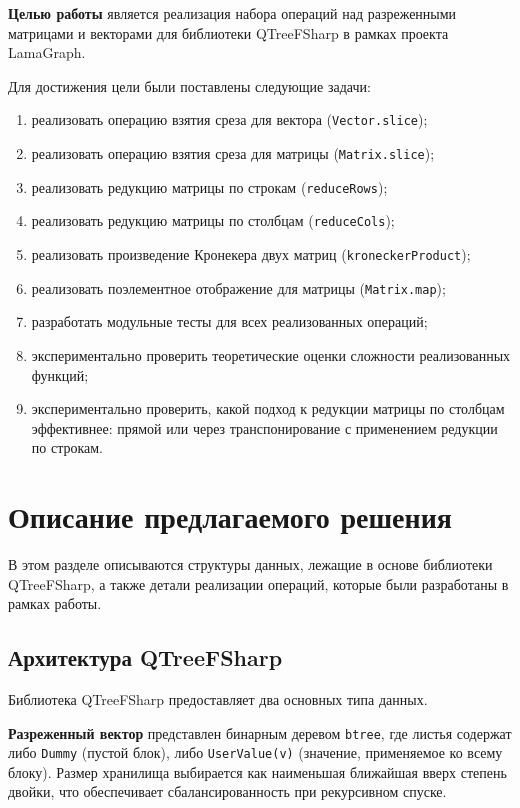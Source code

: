 \documentclass[a4paper]{article}
\begin{document}
\textbf{Целью работы} является реализация набора операций над разреженными матрицами и векторами для библиотеки QTreeFSharp в рамках проекта LamaGraph.

Для достижения цели были поставлены следующие задачи:

\begin{enumerate}
    \item реализовать операцию взятия среза для вектора (\texttt{Vector.slice});
    \item реализовать операцию взятия среза для матрицы (\texttt{Matrix.slice});
    \item реализовать редукцию матрицы по строкам (\texttt{reduceRows});
    \item реализовать редукцию матрицы по столбцам (\texttt{reduceCols});
    \item реализовать произведение Кронекера двух матриц (\texttt{kroneckerProduct});
    \item реализовать поэлементное отображение для матрицы (\texttt{Matrix.map});
    \item разработать модульные тесты для всех реализованных операций;
    \item экспериментально проверить теоретические оценки сложности реализованных функций;
    \item экспериментально проверить, какой подход к редукции матрицы по столбцам эффективнее: прямой или через транспонирование с применением редукции по строкам.
\end{enumerate}


\section{Описание предлагаемого решения}

В этом разделе описываются структуры данных, лежащие в основе библиотеки QTreeFSharp, а также детали реализации операций, которые были разработаны в рамках работы.

\subsection{Архитектура QTreeFSharp}

Библиотека QTreeFSharp предоставляет два основных типа данных.

\textbf{Разреженный вектор} представлен бинарным деревом \texttt{btree}, где листья содержат либо \texttt{Dummy} (пустой блок), либо \texttt{UserValue(v)} (значение, применяемое ко всему блоку). Размер хранилища выбирается как наименьшая ближайшая вверх степень двойки, что обеспечивает сбалансированность при рекурсивном спуске.
\end{document}
